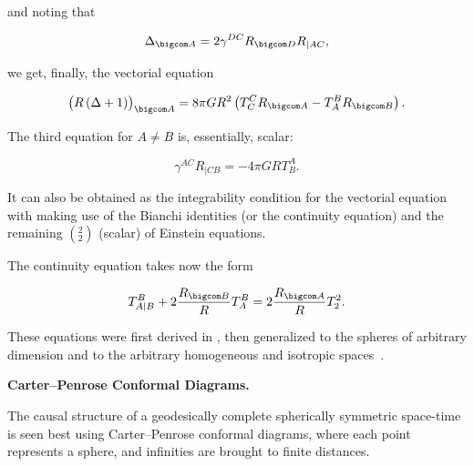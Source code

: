 and noting that

\begin{equation}

\label{derdelta}

\Delta_{\bigcom A} = 2 \gamma^{DC} R_{\bigcom D} R_{|AC} ,

\end{equation}

we get, finally, the vectorial equation

\begin{equation}

\label{veceq}

\bigl(R \left(\Delta + 1 \right) \bigr)_{\bigcom A} = 8 \pi G R^2 \left(T^C_C R_{\bigcom A} - T^B_A R_{\bigcom B} \right) .

\end{equation}

The third equation for $A \ne B$  is, essentially, scalar:

\begin{equation}

\label{aneb}

\gamma^{AC} R_{|CB} = - 4 \pi G R T_B^A .

\end{equation}

It can also be obtained as the integrability condition for the vectorial equation with making use of the Bianchi identities (or the continuity equation) and the remaining  $(^2_2)$ (scalar) of Einstein equations. 

The continuity equation takes now the form 

\begin{equation}

\label{conteq2}

T^B_{A|B} + 2 \frac{R_{\bigcom B}}{R} T^B_A = 2 \frac{R_{\bigcom A}}{R} T^2_2 .

\end{equation}

These equations were first derived in \cite{berez:BKT2}, then generalized to the spheres of arbitrary dimension \cite{berez:BerArx} and to the arbitrary homogeneous and isotropic spaces~\cite{berez:BerSmir1}.



\smallskip



\textbf{Carter--Penrose Conformal Diagrams.}

The causal structure of a geodesically complete spherically symmetric space-time is seen best using Carter--Penrose conformal diagrams, where each point represents a sphere, and infinities are brought to finite distances. 

